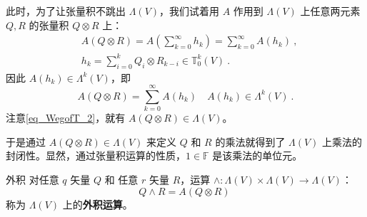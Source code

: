 此时，为了让张量积不跳出 $\Lambda(V)$，我们试着用 $A$ 作用到 $\Lambda(V)$ 上任意两元素 $Q,R$ 的张量积 $Q\otimes R$ 上：
\begin{equation}
\begin{aligned}
&A(Q\otimes R)=A(\sum_{k=0}^\infty h_k)=\sum_{k=0}^\infty  A(h_k)~,\\
&h_k=\sum_{i=0}^k Q_i\otimes R_{k-i}\in\mathbb T_0^k(V)~.
\end{aligned}
\end{equation}
因此 $A(h_k)\in \Lambda^{k}(V)$，即
\begin{equation}
A(Q\otimes R)=\sum_{k=0}^\infty  A(h_k)\quad A(h_k)\in\Lambda^k(V)~.
\end{equation}
注意\autoref{eq_WegofT_2}，就有 $A(Q\otimes R)\in\Lambda(V)$。

于是通过 $A(Q\otimes R)\in\Lambda(V)$ 来定义 $Q$ 和 $R$ 的乘法就得到了 $\Lambda(V)$ 上乘法的封闭性。显然，通过张量积运算的性质，$1\in\mathbb F$ 是该乘法的单位元。
\begin{definition}{外积}\label{def_WegofT_1}
对任意 $q$ 矢量 $Q$ 和 任意 $r$ 矢量 $R$，运算 $\wedge:\Lambda(V)\times\Lambda(V)\rightarrow\Lambda(V)$：
\begin{equation}
Q\wedge R=A(Q\otimes R)~
\end{equation}
称为 $\Lambda(V)$ 上的\textbf{外积运算}。
\end{definition}
